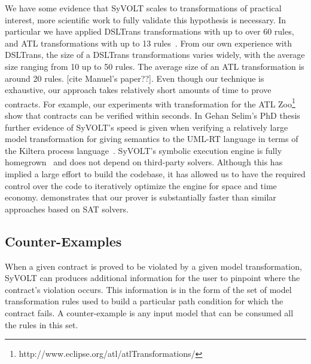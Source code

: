 We have some evidence that SyVOLT scales to transformations of practical
interest, more scientific work to fully validate this hypothesis is
necessary. In particular we have applied DSLTrans transformations with up to
over 60 rules, and ATL transformations with up to 13 rules~\cite{Oakes}. From our own
experience with DSLTrans, the size of a DSLTrans transformations varies widely,
with the average size ranging from 10 up to 50 rules. The average size of an ATL
transformation is around 20 rules. [cite Manuel's paper??].
Even though our technique is exhaustive, our approach takes relatively short
amounts of time to prove contracts. For example, our experiments with
transformation for the ATL
Zoo\footnote{http://www.eclipse.org/atl/atlTransformations/}~\cite{Oakes} show that contracts can be verified within seconds. In Gehan Selim's PhD thesis~\cite{Selim2015}
further evidence of SyVOLT's speed is given when verifying a relatively large model transformation
for giving semantics to the UML-RT language in terms of the Kiltera process
language~\cite{PosseDingel2014}. SyVOLT's symbolic execution engine is fully
homegrown~\cite{LucioVang} and does not depend on third-party solvers. Although
this has implied a large effort to build the codebase, it has allowed us to
have the required control over the code to iteratively optimize the engine for
space and time economy.
\cite{Selim2014} demonstrates that our prover is substantially faster than
similar approaches based on SAT solvers.


\subsection{Counter-Examples}

When a given contract is proved to be violated by a given model transformation,
SyVOLT can produces additional information for the user to pinpoint where
the contract's violation occurs. This information is in
the form of the set of model transformation rules used to build a particular
path condition for which the contract fails. A counter-example is any input model that can be
consumed all the rules in this set.



